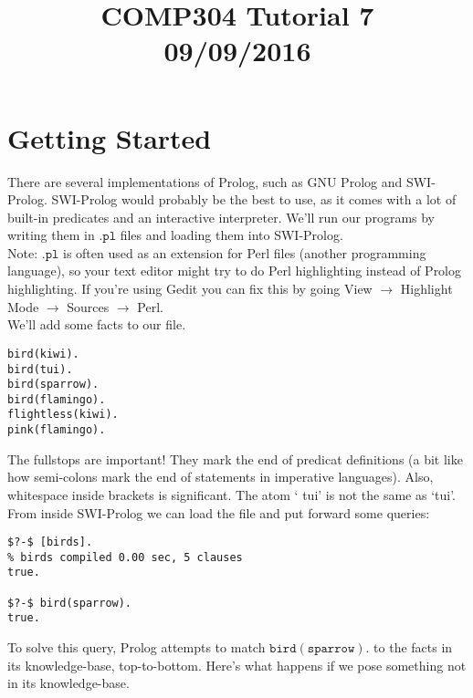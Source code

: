 \documentclass[a4paper,12pt]{article}
\newcommand{\kwa}[1]{\mathtt{#1}}
\begin{document}
\title{COMP304 Tutorial 7 \\ 09/09/2016}
\date{}
\maketitle

\section{Getting Started}

There are several implementations of Prolog, such as GNU Prolog and SWI-Prolog. SWI-Prolog would probably be the best to use, as it comes with a lot of built-in predicates and an interactive interpreter. We'll run our programs by writing them in $\kwa{.pl}$ files and loading them into SWI-Prolog. \\

\noindent
Note: $\kwa{.pl}$ is often used as an extension for Perl files (another programming language), so your text editor might try to do Perl highlighting instead of Prolog highlighting. If you're using Gedit you can fix this by going View $\rightarrow$ Highlight Mode $\rightarrow$ Sources $\rightarrow$ Perl. \\

\noindent
We'll add some facts to our file.

\begin{lstlisting}
bird(kiwi).
bird(tui).
bird(sparrow).
bird(flamingo).
flightless(kiwi).
pink(flamingo).
\end{lstlisting}

\noindent
The fullstops are important! They mark the end of predicat definitions (a bit like how semi-colons mark the end of statements in imperative languages). Also, whitespace inside brackets is significant. The atom ` tui' is not the same as `tui'.\\

\noindent
From inside SWI-Prolog we can load the file and put forward some queries:

\begin{lstlisting}
$?-$ [birds].
% birds compiled 0.00 sec, 5 clauses
true.

$?-$ bird(sparrow).
true.
\end{lstlisting}

\noindent
To solve this query, Prolog attempts to match $\kwa{bird(sparrow).}$ to the facts in its knowledge-base, top-to-bottom. Here's what happens if we pose something not in its knowledge-base.
\end{document}
